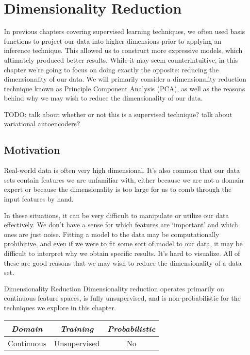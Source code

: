 \chapter{Dimensionality Reduction}
In previous chapters covering supervised learning techniques, we often used basis functions to project our data into higher dimensions prior to applying an inference technique. This allowed us to construct more expressive models, which ultimately produced better results. While it may seem counterintuitive, in this chapter we're going to focus on doing exactly the opposite: reducing the dimensionality of our data. We will primarily consider a dimensionality reduction technique known as Principle Component Analysis (PCA), as well as the reasons behind why we may wish to reduce the dimensionality of our data.

TODO: talk about whether or not this is a supervised technique? talk about variational autoencoders?

\section{Motivation}
Real-world data is often very high dimensional. It's also common that our data sets contain features we are unfamiliar with, either because we are not a domain expert or because the dimensionality is too large for us to comb through the input features by hand.

In these situations, it can be very difficult to manipulate or utilize our data effectively. We don't have a sense for which features are `important' and which ones are just noise. Fitting a model to the data may be computationally prohibitive, and even if we were to fit some sort of model to our data, it may be difficult to interpret why we obtain specific results. It's hard to visualize. All of these are good reasons that we may wish to reduce the dimensionality of a data set.

\begin{mlcube}{Dimensionality Reduction}
Dimensionality reduction operates primarily on continuous feature spaces, is fully unsupervised, and is non-probabilistic for the techniques we explore in this chapter.
\begin{center}
    \begin{tabular}{c|c|c}
    \textit{\textbf{Domain}} & \textit{\textbf{Training}} & \textit{\textbf{Probabilistic}} \\
    \hline
    Continuous & Unsupervised & No \\
    \end{tabular}
\end{center}
\end{mlcube}

